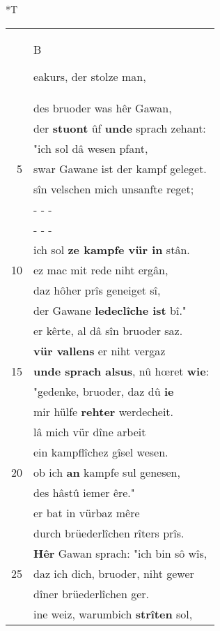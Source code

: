 \documentclass[8pt,a4paper,notitlepage]{article}
\begin{document}
\begin{table}[ht]
\begin{minipage}[t]{0.5\linewidth}
\end{minipage}
\hspace{0.5cm}
\begin{minipage}[t]{0.5\linewidth}
\small
\begin{center}*T
\end{center}
\begin{tabular}{rl}
 & \begin{large}B\end{large}eakurs, der stolze man,\\ 
 & des bruoder was hêr Gawan,\\ 
 & der \textbf{stuont} ûf \textbf{unde} sprach zehant:\\ 
 & "ich sol dâ wesen pfant,\\ 
5 & swar Gawane ist der kampf geleget.\\ 
 & sîn velschen mich unsanfte reget;\\ 
 & \multicolumn{1}{l}{ - - - }\\ 
 & \multicolumn{1}{l}{ - - - }\\ 
 & ich sol \textbf{ze kampfe vür in} stân.\\ 
10 & ez mac mit rede niht ergân,\\ 
 & daz hôher prîs geneiget sî,\\ 
 & der Gawane \textbf{ledeclîche ist} bî."\\ 
 & er kêrte, al dâ sîn bruoder saz.\\ 
 & \textbf{vür vallens} er niht vergaz\\ 
15 & \textbf{unde sprach alsus}, nû hœret \textbf{wie}:\\ 
 & "gedenke, bruoder, daz dû \textbf{ie}\\ 
 & mir hülfe \textbf{rehter} werdecheit.\\ 
 & lâ mich vür dîne arbeit\\ 
 & ein kampflîchez gîsel wesen.\\ 
20 & ob ich \textbf{an} kampfe sul genesen,\\ 
 & des hâstû iemer êre."\\ 
 & er bat in vürbaz mêre\\ 
 & durch brüederlîchen rîters prîs.\\ 
 & \textbf{Hêr} Gawan sprach: "ich bin sô wîs,\\ 
25 & daz ich dich, bruoder, niht gewer\\ 
 & dîner brüederlîchen ger.\\ 
 & ine weiz, warumbich \textbf{strîten} sol,\\ 

\end{tabular}
\end{minipage}
\end{table}
\end{document}
